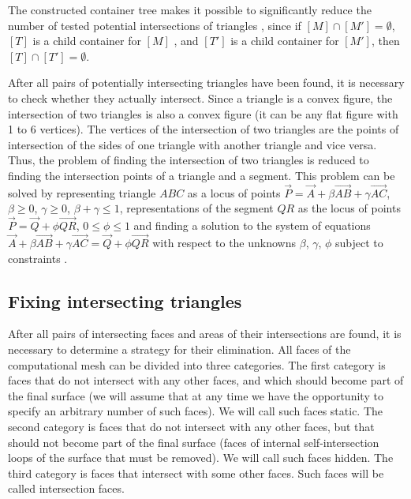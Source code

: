 \documentclass[
11pt,
tightenlines,
twoside,
onecolumn,
nofloats,
nobibnotes,
nofootinbib,
superscriptaddress,
noshowpacs,
centertags]
{revtex4-2}
\begin{document}
The constructed container tree makes it possible to significantly reduce the number of tested potential intersections of triangles \cite{Jung}, since if $[M] \cap [M'] = \emptyset$, $[T]$ is a child container for $[M]$ , and $[T']$ is a child container for $[M']$, then $[T] \cap [T'] = \emptyset$.

After all pairs of potentially intersecting triangles have been found, it is necessary to check whether they actually intersect.
Since a triangle is a convex figure, the intersection of two triangles is also a convex figure (it can be any flat figure with 1 to 6 vertices).
The vertices of the intersection of two triangles are the points of intersection of the sides of one triangle with another triangle and vice versa.
Thus, the problem of finding the intersection of two triangles is reduced to finding the intersection points of a triangle and a segment.
This problem can be solved by representing triangle $ABC$ as a locus of points $\vec{P} = \vec{A} + \beta \vec{AB} + \gamma \vec{AC}$, $\beta \ge 0$, $\gamma \ge 0$, $\beta + \gamma \le 1$, representations of the segment $QR$ as the locus of points $\vec{P} = \vec{Q} + \phi \vec{QR}$, $0 \le \phi \le 1$ and finding a solution to the system of equations $\vec{A} + \beta \vec{AB} + \gamma \vec{AC} = \vec{Q} + \phi \vec{QR}$ with respect to the unknowns $\beta$, $\gamma$, $\phi$ subject to constraints \cite{Freylekhman}.

\subsection{Fixing intersecting triangles}

After all pairs of intersecting faces and areas of their intersections are found, it is necessary to determine a strategy for their elimination.
All faces of the computational mesh can be divided into three categories.
The first category is faces that do not intersect with any other faces, and which should become part of the final surface (we will assume that at any time we have the opportunity to specify an arbitrary number of such faces).
We will call such faces static.
The second category is faces that do not intersect with any other faces, but that should not become part of the final surface (faces of internal self-intersection loops of the surface that must be removed).
We will call such faces hidden.
The third category is faces that intersect with some other faces.
Such faces will be called intersection faces.
\end{document}
